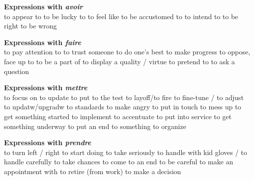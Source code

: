{\bf Expressions with {\em avoir}}\\
   {to appear to}
   {to be lucky to}
   {to feel like}
   {to be accustomed to}
   {to intend to}
   {to be right}
   {to be wrong}

{\bf Expressions with {\em faire}}\\
   {to pay attention to}
   {to trust someone}
   {to do one’s best} 
   {to make progress}
   {to oppose, face up to}
   {to be a part of}
   {to display a quality / virtue}
   {to pretend to}
   {to ask a question}

{\bf Expressions with {\em mettre}}\\
   {to focus on}
   {to update}
   {to put to the test}
   {to layoff/to fire}
   {to fine-tune / to adjust}
 {to updatw/upgradw to standards}
   {to make angry}
   {to put in touch}
   {to mess up}
   {to get something started}
   {to implement}
   {to accentuate}
   {to put into service}
   {to get something underway}
   {to put an end to something}
   {to organize}

{\bf Expressions with {\em prendre}}\\
   {to turn left / right}
   {to start doing}
   {to take seriously}
   {to handle with kid gloves / to handle carefully}
   {to take chances}
   {to come to an end}
   {to be careful}
   {to make an appointment with}
   {to retire (from work)}
   {to make a decision}
